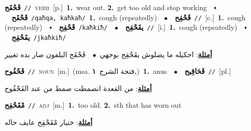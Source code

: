 \documentclass[10pt,a4paper,twoside]{article} %
\begin{document}
\begin{multicols}{2}
{\setlength\topsep{0pt}\textbf{\foreignlanguage{arabic}{قَحْقَح}}\ {\color{gray}\texttt{//}\color{black}}\ \textsc{verb}\ [p.]\ \textbf{1.}~wear out.  \textbf{2.}~get too old and stop working\ \ $\smblkdiamond$\ \ \setlength\topsep{0pt}\textbf{\foreignlanguage{arabic}{قَحْقَح}}\ {\color{gray}\texttt{/qaħqa, kaħkaħ/}\color{black}}\ \textbf{1.}~cough (repeatedly)\ \ $\bullet$\ \ \setlength\topsep{0pt}\textbf{\foreignlanguage{arabic}{قَحْقِح}}\ {\color{gray}\texttt{//}\color{black}}\ [c.]\ \textbf{1.}~cough (repeatedly)\ \ $\smblkdiamond$\ \ \setlength\topsep{0pt}\textbf{\foreignlanguage{arabic}{قَحْقِح}}\ {\color{gray}\texttt{/kaħkiħ/}\color{black}}\ \ $\bullet$\ \ \setlength\topsep{0pt}\textbf{\foreignlanguage{arabic}{يقَحْقِح}}\ {\color{gray}\texttt{//}\color{black}}\ [i.]\ \textbf{1.}~cough (repeatedly)\ \ $\smblkdiamond$\ \ \setlength\topsep{0pt}\textbf{\foreignlanguage{arabic}{يقَحْقِح}}\ {\color{gray}\texttt{/jkaħkiħ/}\color{black}}\  \begin{flushright}\color{gray}\foreignlanguage{arabic}{\textbf{\underline{\foreignlanguage{arabic}{أمثلة}}}: احكيله ما يضلوش يقَحْقِح بوجهي\ $\bullet$\ \  قَحْقَح البلفون صار بده تغيير}\end{flushright}\color{black}} \vspace{2mm}

{\setlength\topsep{0pt}\textbf{\foreignlanguage{arabic}{قَحْقُوح}}\ {\color{gray}\texttt{//}\color{black}}\ \textsc{noun}\ [m.]\ \color{gray}(msa. \foreignlanguage{arabic}{فتحة الشرج}~\foreignlanguage{arabic}{\textbf{١.}})\color{black}\ \textbf{1.}~anus\ \ $\bullet$\ \ \setlength\topsep{0pt}\textbf{\foreignlanguage{arabic}{قَحَاقِيح}}\ {\color{gray}\texttt{//}\color{black}}\ [pl.]\  \begin{flushright}\color{gray}\foreignlanguage{arabic}{\textbf{\underline{\foreignlanguage{arabic}{أمثلة}}}: من القعدة انصمطت صمط من عند القَحْقُوح}\end{flushright}\color{black}} \vspace{2mm}

{\setlength\topsep{0pt}\textbf{\foreignlanguage{arabic}{مْقَحْقِح}}\ {\color{gray}\texttt{//}\color{black}}\ \textsc{adj}\ [m.]\ \textbf{1.}~too old.  \textbf{2.}~sth that has worn out\  \begin{flushright}\color{gray}\foreignlanguage{arabic}{\textbf{\underline{\foreignlanguage{arabic}{أمثلة}}}: ختيار مْقَحْقِح عايف حاله}\end{flushright}\color{black}} \vspace{2mm}


\end{multicols}
\end{document}
